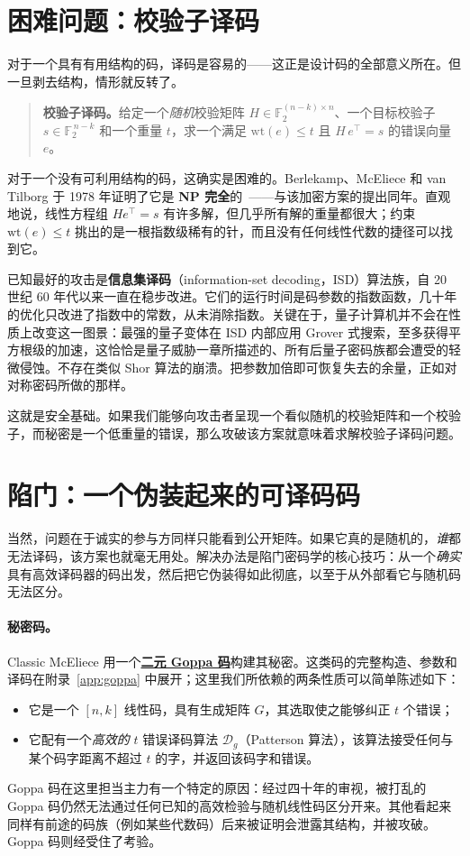 \section{困难问题：校验子译码}

对于一个具有有用结构的码，译码是容易的——这正是设计码的全部意义所在。但一旦剥去结构，情形就反转了。

\begin{quote}
\textbf{校验子译码。}给定一个\emph{随机}校验矩阵 $H \in \mathbb{F}_2^{(n-k)\times n}$、一个目标校验子 $s \in \mathbb{F}_2^{\,n-k}$ 和一个重量 $t$，求一个满足 $\mathrm{wt}(e) \le t$ 且 $H\,e^\top = s$ 的错误向量 $e$。
\end{quote}

对于一个没有可利用结构的码，这确实是困难的。Berlekamp、McEliece 和 van Tilborg 于 1978 年证明了它是 \textbf{NP 完全}的~\cite{bmvt1978}——与该加密方案的提出同年。直观地说，线性方程组 $He^\top = s$ 有许多解，但几乎所有解的重量都很大；约束 $\mathrm{wt}(e) \le t$ 挑出的是一根指数级稀有的针，而且没有任何线性代数的捷径可以找到它。

已知最好的攻击是\textbf{信息集译码}（information-set decoding，ISD）算法族，自 20 世纪 60 年代以来一直在稳步改进。它们的运行时间是码参数的指数函数，几十年的优化只改进了指数中的常数，从未消除指数。关键在于，量子计算机并不会在性质上改变这一图景：最强的量子变体在 ISD 内部应用 Grover 式搜索，至多获得平方根级的加速，这恰恰是量子威胁一章所描述的、所有后量子密码族都会遭受的轻微侵蚀。不存在类似 Shor 算法的崩溃。把参数加倍即可恢复失去的余量，正如对对称密码所做的那样。

这就是安全基础。如果我们能够向攻击者呈现一个看似随机的校验矩阵和一个校验子，而秘密是一个低重量的错误，那么攻破该方案就意味着求解校验子译码问题。

\section{陷门：一个伪装起来的可译码码}

当然，问题在于诚实的参与方同样只能看到公开矩阵。如果它真的是随机的，\emph{谁}都无法译码，该方案也就毫无用处。解决办法是陷门密码学的核心技巧：从一个\emph{确实}具有高效译码器的码出发，然后把它伪装得如此彻底，以至于从外部看它与随机码无法区分。

\paragraph{秘密码。}
Classic McEliece 用一个\hyperref[app:goppa]{\textbf{二元 Goppa 码}}构建其秘密。这类码的完整构造、参数和译码在附录~\ref{app:goppa} 中展开；这里我们所依赖的两条性质可以简单陈述如下：
\begin{itemize}
  \item 它是一个 $[n,k]$ 线性码，具有生成矩阵 $G$，其选取使之能够纠正 $t$ 个错误；
  \item 它配有一个\emph{高效的} $t$ 错误译码算法 $\mathcal{D}_g$（Patterson 算法），该算法接受任何与某个码字距离不超过 $t$ 的字，并返回该码字和错误。
\end{itemize}
Goppa 码在这里担当主力有一个特定的原因：经过四十年的审视，被打乱的 Goppa 码仍然无法通过任何已知的高效检验与随机线性码区分开来。其他看起来同样有前途的码族（例如某些代数码）后来被证明会泄露其结构，并被攻破。Goppa 码则经受住了考验。

